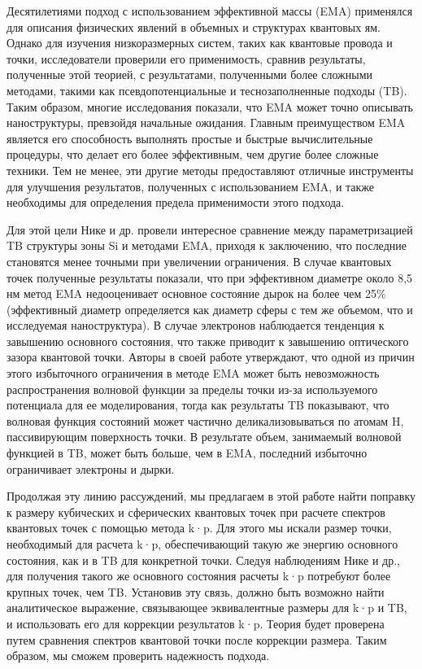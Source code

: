 \documentclass[a4paper,14pt]{extarticle}
\begin{document}
Десятилетиями подход с использованием эффективной массы (EMA) применялся для описания физических явлений в объемных и структурах квантовых ям. Однако для изучения низкоразмерных систем, таких как квантовые провода и точки, исследователи проверили его применимость, сравнив результаты, полученные этой теорией, с результатами, полученными более сложными методами, такими как псевдопотенциальные и теснозаполненные подходы (TB). Таким образом, многие исследования показали, что EMA может точно описывать наноструктуры, превзойдя начальные ожидания. Главным преимуществом EMA является его способность выполнять простые и быстрые вычислительные процедуры, что делает его более эффективным, чем другие более сложные техники. Тем не менее, эти другие методы предоставляют отличные инструменты для улучшения результатов, полученных с использованием EMA, и также необходимы для определения предела применимости этого подхода.\cite{bolivar}

Для этой цели Нике и др. провели интересное сравнение между параметризацией TB структуры зоны Si и методами EMA, приходя к заключению, что последние становятся менее точными при увеличении ограничения. В случае квантовых точек полученные результаты показали, что при эффективном диаметре около 8,5 нм метод EMA недооценивает основное состояние дырок на более чем 25\% (эффективный диаметр определяется как диаметр сферы с тем же объемом, что и исследуемая наноструктура). В случае электронов наблюдается тенденция к завышению основного состояния, что также приводит к завышению оптического зазора квантовой точки. Авторы в своей работе утверждают, что одной из причин этого избыточного ограничения в методе EMA может быть невозможность распространения волновой функции за пределы точки из-за используемого потенциала для ее моделирования, тогда как результаты TB показывают, что волновая функция состояний может частично деликализовываться по атомам H, пассивирующим поверхность точки. В результате объем, занимаемый волновой функцией в TB, может быть больше, чем в EMA, последний избыточно ограничивает электроны и дырки.\cite{bolivar}

Продолжая эту линию рассуждений, мы предлагаем в этой работе найти поправку к размеру кубических и сферических квантовых точек при расчете спектров квантовых точек с помощью метода k·p. Для этого мы искали размер точки, необходимый для расчета k·p, обеспечивающий такую же энергию основного состояния, как и в TB для конкретной точки. Следуя наблюдениям Нике и др., для получения такого же основного состояния расчеты k·p потребуют более крупных точек, чем TB. Установив эту связь, должно быть возможно найти аналитическое выражение, связывающее эквивалентные размеры для k·p и TB, и использовать его для коррекции результатов k·p. Теория будет проверена путем сравнения спектров квантовой точки после коррекции размера. Таким образом, мы сможем проверить надежность подхода.
\end{document}
